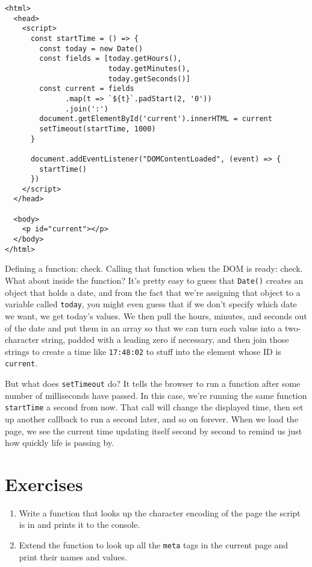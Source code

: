 \begin{verbatim}
<html>
  <head>
    <script>
      const startTime = () => {
        const today = new Date()
        const fields = [today.getHours(),
                        today.getMinutes(),
                        today.getSeconds()]
        const current = fields
              .map(t => `${t}`.padStart(2, '0'))
              .join(':')
        document.getElementById('current').innerHTML = current
        setTimeout(startTime, 1000)
      }

      document.addEventListener("DOMContentLoaded", (event) => {
        startTime()
      })
    </script>
  </head>

  <body>
    <p id="current"></p>
  </body>
</html>
\end{verbatim}

Defining a function: check.
Calling that function when the DOM is ready: check.
What about inside the function?
It's pretty easy to guess that \texttt{Date()} creates an object that holds a date,
and from the fact that we're assigning that object to a variable called \texttt{today},
you might even guess that if we don't specify which date we want,
we get today's values.
We then pull the hours, minutes, and seconds out of the date and put them in an array
so that we can turn each value into a two-character string,
padded with a leading zero if necessary,
and then join those strings to create a time like \texttt{17:48:02}
to stuff into the element whose ID is \texttt{current}.

But what does \texttt{setTimeout} do?
It tells the browser to run a function after some number of milliseconds have passed.
In this case,
we're running the same function \texttt{startTime} a second from now.
That call will change the displayed time,
then set up another callback to run a second later,
and so on forever.
When we load the page,
we see the current time updating itself second by second
to remind us just how quickly life is passing by.

\section{Exercises}\label{s:pages-exercises}


\begin{enumerate}
\item
  Write a function that looks up the character encoding of the page the script is in
  and prints it to the console.
\item
  Extend the function to look up all the \texttt{meta} tags in the current page
  and print their names and values.
\end{enumerate}


